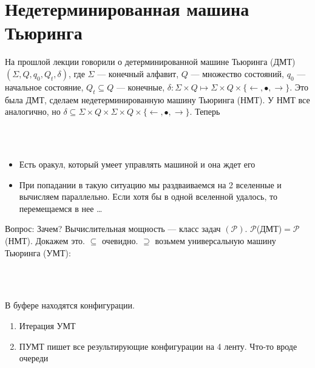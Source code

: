 \documentclass[a4paper]{article}
\newcommand{\Rho}{\mathcal{P}}
\begin{document}
\section{Недетерминированная машина Тьюринга}
{\large На прошлой лекции говорили о детерминированной машине Тьюринга (ДМТ) $(\Sigma, Q, q_{0}, Q_{t}, \delta)$, где $\Sigma$ --- конечный алфавит, $Q$ --- множество состояний, $q_{0}$ --- начальное состояние, $Q_{t}\subseteq Q$ --- конечные, $\delta: \Sigma \times Q \mapsto \Sigma \times Q \times \{\leftarrow, \bullet, \rightarrow \}$. Это была ДМТ, сделаем недетерминированную машину Тьюринга (НМТ). У НМТ все аналогично, но $\delta\subseteq \Sigma \times Q \times \Sigma \times Q \times \{\leftarrow, \bullet, \rightarrow \}$. Теперь }
\\

\\
\\
{\large
\begin{itemize}
  \item Есть оракул, который умеет управлять машиной и она ждет его
  \item При попадании в такую ситуацию мы раздваиваемся на 2 вселенные и вычисляем параллельно. Если хотя бы в одной вселенной удалось, то перемещаемся в нее \ldots
\end{itemize} }


{\large Вопрос: Зачем?
Вычислительная мощность --- класс задач $(\Rho)$. $\Rho$(ДМТ)$ = \Rho$(НМТ). Докажем это. $\subseteq$ очевидно. $\supseteq$ возьмем универсальную машину Тьюринга (УМТ):}
\\
\\
\\
{\large В буфере находятся конфигурации. \begin{enumerate}
\item Итерация УМТ
\item ПУМТ пишет все результирующие конфигурации на 4 ленту. Что-то вроде очереди
\end{enumerate} }
\end{document}
